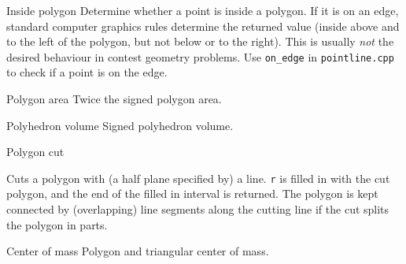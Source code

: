 \begin{algorithm}{Inside polygon}
\desc
Determine whether a point is inside a polygon. If it is on an edge,
standard computer graphics rules determine the returned value (inside above
and to the left of the polygon, but not below or to the right).
This is usually \emph{not} the desired behaviour in contest geometry problems.
Use {\tt on\_edge} in {\tt pointline.cpp} to check if a point is on the edge.
\end{algorithm}




\begin{algorithm}{Polygon area}
\desc
Twice the signed polygon area.
\end{algorithm}

\begin{algorithm}{Polyhedron volume}
\desc
Signed polyhedron volume.
\end{algorithm}

\begin{algorithm}{Polygon cut}

\desc
Cuts a polygon with (a half plane specified by) a line.
{\tt r} is filled in with the cut polygon, and the end of the filled in
interval is returned. The polygon is kept connected by (overlapping)
line segments along the cutting line if the cut splits the polygon in parts.
\end{algorithm}



\begin{algorithm}{Center of mass}
\desc
Polygon and triangular center of mass.
\end{algorithm}

